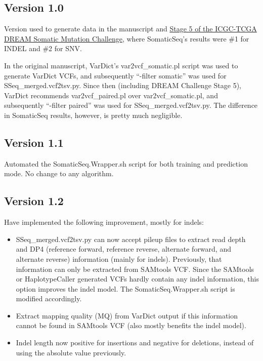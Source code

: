 \documentclass[10pt,letterpaper]{article}
\begin{document}
\begin{sloppypar}
\subsection{Version 1.0}
Version used to generate data in the manuscript and \href{https://www.synapse.org/#!Synapse:syn312572/wiki/72943}{Stage 5 of the ICGC-TCGA DREAM Somatic Mutation Challenge}, where SomaticSeq's results were \#1 for INDEL and \#2 for SNV. 

In the original manuscript, VarDict's var2vcf\_somatic.pl script was used to generate VarDict VCFs, and subsequently ``-filter somatic'' was used for SSeq\_merged.vcf2tsv.py. Since then (including DREAM Challenge Stage 5), VarDict recommends var2vcf\_paired.pl over var2vcf\_somatic.pl, and subsequently ``-filter paired'' was used for SSeq\_merged.vcf2tsv.py. The difference in SomaticSeq results, however, is pretty much negligible. 

\subsection{Version 1.1}
Automated the SomaticSeq.Wrapper.sh script for both training and prediction mode. No change to any algorithm. 

\subsection{Version 1.2}
Have implemented the following improvement, mostly for indels:

\begin{itemize}
 
  \item 
  SSeq\_merged.vcf2tsv.py can now accept pileup files to extract read depth and DP4 (reference forward, reference reverse, alternate forward, and alternate reverse) information (mainly for indels). Previously, that information can only be extracted from SAMtools VCF. Since the SAMtools or HaplotypeCaller generated VCFs hardly contain any indel information, this option improves the indel model. The SomaticSeq.Wrapper.sh script is modified accordingly.
 
  \item
  Extract mapping quality (MQ) from VarDict output if this information cannot be found in SAMtools VCF (also mostly benefits the indel model). 
 
  \item
  Indel length now positive for insertions and negative for deletions, instead of using the absolute value previously. 
 

\end{itemize}
\end{sloppypar}
\end{document}
